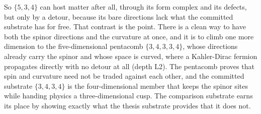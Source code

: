 So $\{5,3,4\}$ can host matter after all, through its form complex and its defects, but only by a detour, because its bare directions lack what the committed substrate has for free. That contrast is the point. There is a clean way to have both the spinor directions and the curvature at once, and it is to climb one more dimension to the five-dimensional pentacomb $\{3,4,3,3,4\}$, whose directions already carry the spinor and whose space is curved, where a Kahler-Dirac fermion propagates directly with no detour at all (depth L2). The pentacomb proves that spin and curvature need not be traded against each other, and the committed substrate $\{3,4,3,4\}$ is the four-dimensional member that keeps the spinor sites while handing physics a three-dimensional cusp. The comparison substrate earns its place by showing exactly what the thesis substrate provides that it does not.
